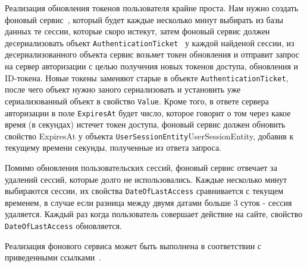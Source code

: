 Реализация обновления токенов пользователя крайне проста.
Нам нужно создать фоновый сервис~\cite{microsoftHostedservice2023}, который будет каждые несколько минут выбирать из
базы данных те сессии, которые скоро истекут,
затем фоновый сервис должен десериализовать объект \texttt{AuthenticationTicket}~\cite{microsoftAuthenticationTicket2023}
у каждой найденой сессии, из десериализованного объекта
сервис возьмет токен обновления и отправит запрос на сервер авторизации с целью получения новых токенов доступа,
обновления и ID-токена.
Новые токены заменяют старые в объекте \texttt{AuthenticationTicket}, после чего объект нужно заного сериализовать и
установить уже сериализованный объект в свойство \texttt{Value}.
Кроме того, в ответе сервера авторизации в поле \texttt{ExpiresAt} будет число, которое говорит о том через какое время
(в секундах) истечет токен доступа,
фоновый сервис должен обновить свойство ExpiresAt у объекта \texttt{UserSessionEntity}UserSessionEntity, добавив
к текущему времени секунды, полученные из ответа запроса.

Помимо обновления пользовательских сессий, фоновый сервис отвечает за удалений сессий, которые долго не использовались.
Каждые несколько минут выбираются сессии, их свойства \texttt{DateOfLastAccess} сравнивается с текущем временем,
в случае если разница между двумя датами больше 3 суток - сессия удаляется.
Каждый раз когда пользователь совершает действие на сайте, свойство \texttt{DateOfLastAccess} обновляется.

Реализация фонового сервиса может быть выполнена в соответствии с приведенными
ссылками~\cite{backroundService_2023, configurationBackgroundService_2023}.